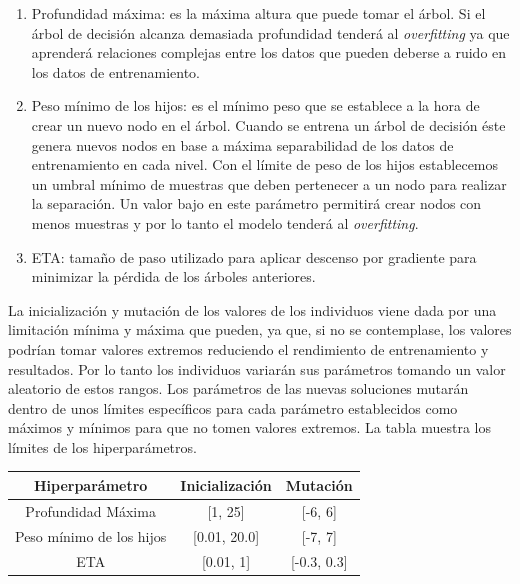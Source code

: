 \begin{enumerate}
            \begin{enumerate}

                \item Profundidad máxima: es la máxima altura que puede tomar el árbol. Si el árbol de decisión alcanza demasiada profundidad tenderá al \textit{overfitting} ya que aprenderá relaciones complejas entre los datos que pueden deberse a ruido en los datos de entrenamiento.

                \item Peso mínimo de los hijos: es el mínimo peso que se establece a la hora de crear un nuevo nodo en el árbol. Cuando se entrena un árbol de decisión éste genera nuevos nodos en base a máxima separabilidad de los datos de entrenamiento en cada nivel. Con el límite de peso de los hijos establecemos un umbral mínimo de muestras que deben pertenecer a un nodo para realizar la separación. Un valor bajo en este parámetro permitirá crear nodos con menos muestras y por lo tanto el modelo tenderá al \textit{overfitting}.

                \item ETA: tamaño de paso utilizado para aplicar descenso por gradiente para minimizar la pérdida de los árboles anteriores.

            \end{enumerate}

            La inicialización y mutación de los valores de los individuos viene dada por una limitación mínima y máxima que pueden, ya que, si no se contemplase, los valores podrían tomar valores extremos reduciendo el rendimiento de entrenamiento y resultados. Por lo tanto los individuos variarán sus parámetros tomando un valor aleatorio de estos rangos.  Los parámetros de las nuevas soluciones mutarán dentro de unos límites específicos para cada parámetro establecidos como máximos y mínimos para que no tomen valores extremos. La tabla \cite{InitAndMutationLimitsHyperparamsTable} muestra los límites de los hiperparámetros.

            \begin{table}[H]
                \centering
                    \begin{tabular}{ |c|c|c| } 
                    \hline
                    Hiperparámetro & Inicialización & Mutación\\
                    \hline
                        Profundidad Máxima & [1, 25] & [-6, 6]\\ 
                        Peso mínimo de los hijos & [0.01, 20.0] & [-7, 7] \\ 
                        ETA & [0.01, 1] &  [-0.3, 0.3] \\ 
                    \hline


\end{tabular}
\end{table}
\end{enumerate}
